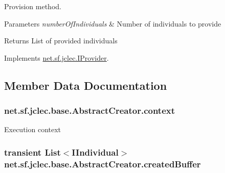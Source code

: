 Provision method.


\begin{DoxyParams}{Parameters}
{\em number\-Of\-Individuals} & Number of individuals to provide\\
\hline
\end{DoxyParams}
\begin{DoxyReturn}{Returns}
List of provided individuals
\end{DoxyReturn}
 

Implements \hyperlink{interfacenet_1_1sf_1_1jclec_1_1_i_provider_a4e3b8fff3419d3c9f1902e26de309640}{net.\-sf.\-jclec.\-I\-Provider}.



\subsection{Member Data Documentation}
\hypertarget{classnet_1_1sf_1_1jclec_1_1base_1_1_abstract_creator_a292f35dcb2a8428bee69e67bdfc4fe01}{
\subsubsection[{context}]{ net.\-sf.\-jclec.\-base.\-Abstract\-Creator.\-context\hspace{0.3cm}{\ttfamily [protected]}}}\label{classnet_1_1sf_1_1jclec_1_1base_1_1_abstract_creator_a292f35dcb2a8428bee69e67bdfc4fe01}
Execution context \hypertarget{classnet_1_1sf_1_1jclec_1_1base_1_1_abstract_creator_a22720199ae989de1209e83a4df38969b}{
\subsubsection[{created\-Buffer}]{\setlength{\rightskip}{0pt plus 5cm}transient List$<${\bf I\-Individual}$>$ net.\-sf.\-jclec.\-base.\-Abstract\-Creator.\-created\-Buffer\hspace{0.3cm}{\ttfamily [protected]}}}\label{classnet_1_1sf_1_1jclec_1_1base_1_1_abstract_creator_a22720199ae989de1209e83a4df38969b}
